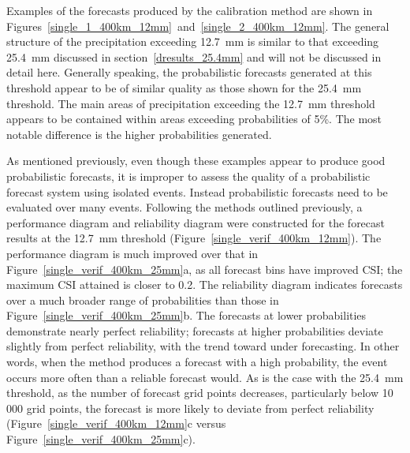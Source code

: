 Examples of the forecasts produced by the calibration method are shown in \mbox{Figures \ref{single_1_400km_12mm} and \ref{single_2_400km_12mm}}.
The general structure of the precipitation exceeding \mbox{12.7 mm} is similar to that exceeding \mbox{25.4 mm} discussed in \mbox{section \ref{dresults_25.4mm}} and will not be discussed in detail here.
Generally speaking, the probabilistic forecasts generated at this threshold appear to be of similar quality as those shown for the \mbox{25.4 mm} threshold.
The main areas of precipitation exceeding the \mbox{12.7 mm} threshold appears to be contained within areas exceeding probabilities of \mbox{5\%}.
The most notable difference is the higher probabilities generated.


As mentioned previously, even though these examples appear to produce good probabilistic forecasts, it is improper to assess the quality of a probabilistic forecast system using isolated events.
Instead probabilistic forecasts need to be evaluated over many events.
Following the methods outlined previously, a performance diagram and reliability diagram were constructed for the forecast results at the \mbox{12.7 mm} threshold \mbox{(Figure \ref{single_verif_400km_12mm})}.
The performance diagram is much improved over that in \mbox{Figure \ref{single_verif_400km_25mm}a}, as all forecast bins have improved CSI; the maximum CSI attained is closer to 0.2.
The reliability diagram indicates forecasts over a much broader range of probabilities than those in \mbox{Figure \ref{single_verif_400km_25mm}b}.
The forecasts at lower probabilities demonstrate nearly perfect reliability; forecasts at higher probabilities deviate slightly from perfect reliability, with the trend toward under forecasting.
In other words, when the method produces a forecast with a high probability, the event occurs more often than a reliable forecast would.
As is the case with the \mbox{25.4 mm} threshold, as the number of forecast grid points decreases, particularly below 10 000 grid points, the forecast is more likely to deviate from perfect reliability (\mbox{Figure \ref{single_verif_400km_12mm}c} versus \mbox{Figure \ref{single_verif_400km_25mm}c}).




